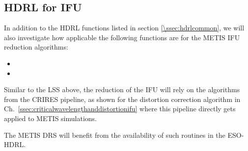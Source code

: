 \subsection{HDRL for IFU}
\label{ssec:hdrllms}

In addition to the HDRL functions listed in section \ref{\ssec:hdrlcommon}, we will also investigate how applicable the following functions are for the METIS IFU reduction algorithms:
\begin{itemize}
    \item {}
    \item {}
\end{itemize}

Similar to the LSS above, the reduction of the IFU will rely on the algorithms
from the \ac{CRIRES} pipeline, as shown for the distortion correction algorithm
in Ch.~\ref{ssec:criticalwavelengthanddistortionifu} where this pipeline
directly gets applied to METIS simulations.

The METIS \ac{DRS} will benefit from the availability of such routines in the ESO-HDRL.


